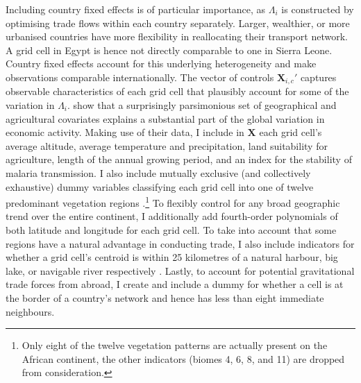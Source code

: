 \documentclass[11pt, oneside]{article}   	%
\begin{document}
Including country fixed effects is of particular importance, as $\Lambda_{i}$ is constructed by optimising trade flows within each country separately. Larger, wealthier, or more urbanised countries have more flexibility in reallocating their transport network. A grid cell in Egypt is hence not directly comparable to one in Sierra Leone.  Country fixed effects account for this underlying heterogeneity and make observations comparable internationally. The vector of controls $\textbf{X}_{i,c}'$ captures observable characteristics of each grid cell that plausibly account for some of the variation in $\Lambda_{i}$. \cite{Henderson_GlobalSpatialDistribution_2018} show that a surprisingly parsimonious set of geographical and agricultural covariates explains a substantial part of the global variation in economic activity. Making use of their data, I include in $\textbf{X}$ each grid cell's average altitude, average temperature and precipitation, land suitability for agriculture, length of the annual growing period, and an index for the stability of malaria transmission. I also include mutually exclusive (and collectively exhaustive) dummy variables classifying each grid cell into one of twelve predominant vegetation regions \citep[or \emph{Biomes}, see][]{Henderson_GlobalSpatialDistribution_2018}.\footnote{Only eight of the twelve vegetation patterns are actually present on the African continent, the other indicators (biomes 4, 6, 8, and 11) are dropped from consideration.} To flexibly control for any broad geographic trend over the entire continent, I additionally add fourth-order polynomials of both latitude and longitude for each grid cell. To take into account that some regions have a natural advantage in conducting trade, I also include indicators for whether a grid cell's centroid is within 25 kilometres of a natural harbour, big lake, or navigable river respectively \citep[again using data from][]{Henderson_GlobalSpatialDistribution_2018}. Lastly, to account for potential gravitational trade forces from abroad, I create and include a dummy for whether a cell is at the border of a country's network and hence has less than eight immediate neighbours.
\end{document}
